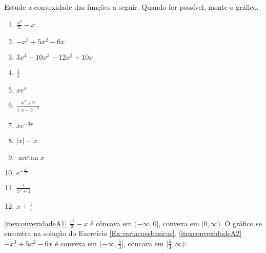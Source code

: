 \begin{exo}
Estude a convexidade das funções a seguir. Quando for possível, monte o gráfico.
\begin{multicols}{4}
\begin{enumerate}
\item\label{itexconvexidadeA1} $\frac{x^3}{3}-x$
\item\label{itexconvexidadeA2} $-x^3+5x^2-6x$
\item\label{itexconvexidadeA3} $\scriptstyle{3x^4-10x^3-12x^2+10x}$
\item\label{itexconvexidadeA4} $\frac{1}{x}$
\item\label{itexconvexidadeA5} $xe^x$
\item\label{itexconvexidadeA6} $\frac{x^2+9}{(x-3)^2}$
\item\label{itexconvexidadeA7} $xe^{-3x}$
\item\label{itexconvexidadeA10} $|x|-x$ 
\item\label{itexconvexidadeA11} $\arctan x$
\item\label{itexconvexidadeA12} $e^{-\frac{x^2}{2}}$ 
\item\label{itexconvexidadeA13} $\frac{1}{x^2+1}$ 
\item\label{itexconvexidadeA14} $x+\frac{1}{x}$
\end{enumerate}
\end{multicols}
\vspace{0.01cm}
\begin{sol}
\eqref{itexconvexidadeA1}
$\frac{x^3}{3}-x$ é côncava em $(-\infty,0]$, convexa em $[0,\infty)$.
O gráfico se encontra na solução do Exercício \ref{Ex:variacoesbasicas}.
\eqref{itexconvexidadeA2} $-x^3+5x^2-6x$ é convexa em $(-\infty,\tfrac53]$,
côncava em $[\frac53,\infty)$:
\begin{center}
\begin{bmlimage}\end{bmlimage}

\end{center}
\end{sol}
\end{exo}
